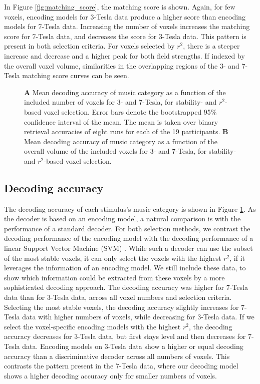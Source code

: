 In Figure \ref{fig:matching_score}, the matching score is shown. Again, for
few voxels, encoding models for 3-Tesla data produce a higher score than encoding
models for 7-Tesla data. Increasing the number of voxels increases the matching
score for 7-Tesla data, and decreases the score for 3-Tesla data. This pattern
is present in both selection criteria. For voxels selected by $r^2$, there is a
steeper increase and decrease and a higher peak for both field strengths.
If indexed by the overall voxel volume, similarities in the overlapping regions
of the 3- and 7-Tesla matching score curves can be seen.
\begin{figure}
  \centering
  \def\svgwidth{\linewidth}
  
	
  \caption{\textbf{A} Mean decoding accuracy of music category as a function of the included number of
  voxels for 3- and 7-Tesla, for stability- and $r^2$-based voxel selection. Error bars denote the bootstrapped 95\% confidence
  interval of the mean. The mean is taken over binary retrieval accuracies of
  eight runs for each of the 19 participants. \textbf{B} Mean decoding accuracy
  of music category as a function of the overall volume of the included voxels for 3- and 7-Tesla, for stability- and $r^2$-based voxel selection.}
 \label{fig:decoding_accuracy}
\end{figure}


\subsection*{Decoding accuracy}

The decoding accuracy of each stimulus's music category is shown in Figure
\ref{fig:decoding_accuracy}. As the decoder is based on an encoding model, a
natural comparison is with the performance of a standard decoder. For both selection methods, we contrast the decoding
performance of the encoding model with the decoding performance of a linear Support
Vector Machine (SVM) \citep{FCH+08,V13}. While such a decoder can use the subset of the most stable voxels, it can only select the voxels with the highest $r^2$, if it leverages the information of an encoding model. We still include these data, to show which information could be extracted from these voxels by a more sophisticated decoding approach.  The decoding accuracy was higher for 7-Tesla data than for 3-Tesla data, across all voxel numbers and selection criteria.  Selecting the most stable voxels, the decoding accuracy slightly increases for 7-Tesla data with higher numbers of voxels, while decreasing for 3-Tesla data.
If we select the voxel-specific encoding models with the highest $r^2$, the
decoding accuracy decreases for 3-Tesla data, but first stays level and then
decreases for 7-Tesla data. Encoding models on 3-Tesla data show a higher or equal decoding accuracy than a discriminative decoder across all numbers of
voxels. This contrasts the pattern present in the 7-Tesla data, where our
decoding model shows a higher decoding accuracy only for smaller numbers of
voxels. %

